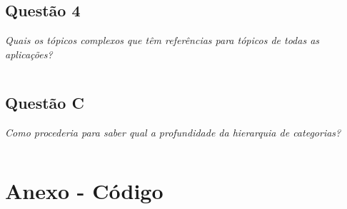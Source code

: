 \documentclass[a4paper,12pt]{article}
\begin{document}
	
	\inputminted{sql}{3.sql}

\subsection{Questão 4}

	\emph{Quais os tópicos complexos que têm referências para tópicos de todas as aplicações?}\\

	\inputminted{sql}{4.sql}

\subsection{Questão C}

	\emph{Como procederia para saber qual a profundidade da hierarquia de categorias?}\\

	\inputminted{sql}{C.sql}


\newpage 
\section{Anexo - Código}


	\inputminted{sql}{sql3.sql}
\end{document}
